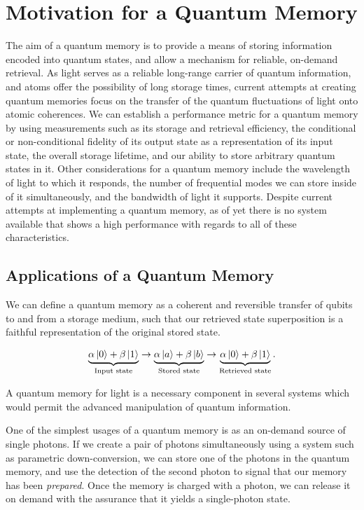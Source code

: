 \chapter{Motivation for a Quantum Memory}
\label{ch:1} 

The aim of a quantum memory is to provide a means of storing information encoded into quantum states, and allow a mechanism for reliable, on-demand retrieval.  As light serves as a reliable long-range carrier of quantum information, and atoms offer the possibility of long storage times, current attempts at creating quantum memories focus on the transfer of the quantum fluctuations of light onto atomic coherences.  We can establish a performance metric for a quantum memory by using measurements such as its storage and retrieval efficiency, the conditional or non-conditional fidelity of its output state as a representation of its input state, the overall storage lifetime, and our ability to store arbitrary quantum states in it.  Other considerations for a quantum memory include the wavelength of light to which it responds, the number of frequential modes we can store inside of it simultaneously, and the bandwidth of light it supports.  Despite current attempts at implementing a quantum memory, as of yet there is no system available that shows a high performance with regards to all of these characteristics.


\section{Applications of a Quantum Memory}

We can define a quantum memory as a coherent and reversible transfer of qubits to and from a storage medium, such that our retrieved state superposition is a faithful representation of the original stored state.

\begin{eqnarray}
  \label{eq:qmem}
  \underbrace{\alpha \left| 0 \right> + \beta \left| 1 \right>}_{\text{Input state}}  \rightarrow \underbrace{\alpha \left| a \right> + \beta \left| b \right>}_{\text{Stored state}} \rightarrow \underbrace{\alpha \left| 0 \right> + \beta \left| 1 \right>}_{\text{Retrieved state}}.
\end{eqnarray}

\noindent
A quantum memory for light is a necessary component in several systems which would permit the advanced manipulation of quantum information.  

One of the simplest usages of a quantum memory is as an on-demand source of  single photons.  If we create a pair of photons simultaneously using a system such as parametric down-conversion, we can store one of the photons in the quantum memory, and use the detection of the second photon to signal that our memory has been \emph{prepared}.  Once the memory is charged with a photon, we can release it on demand with the assurance that it yields a single-photon state.  

